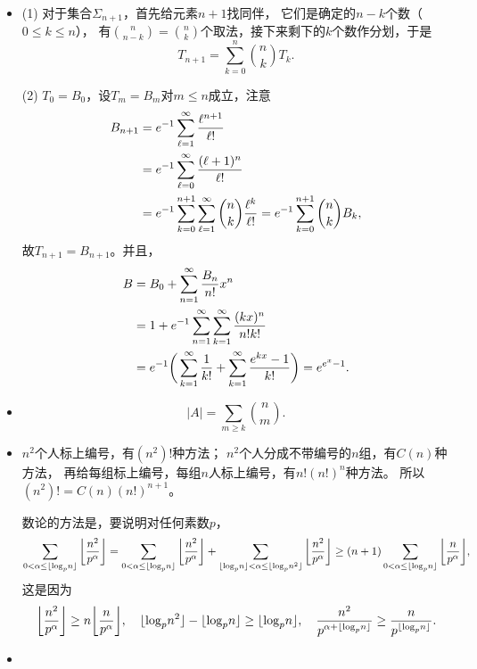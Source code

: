 \begin{itemize}
    (6) $\o\in\ls\{f_n\ge C\}\iff \exists N \st \forall n\ge N, f_n(\o)\ge C
    \implies \forall N, \exists n\ge N \st f_n(\o)\ge C
    \iff \o\in\Big\{\ls f_n\ge C\Big\}$，后面三个一样。

    \item[2.4]
    (1) 对于集合$\Sigma_{n+1}$，首先给元素$n+1$找同伴，
    它们是确定的$n-k$个数（$0\le k\le n$），
    有$\binom{n}{n-k}=\binom{n}{k}$个取法，接下来剩下的$k$个数作分划，于是
    $$T_{n+1}=\sum_{k=0}^n\binom{n}{k}T_k.$$

    (2) $T_0=B_0$，设$T_m=B_m$对$m\le n$成立，注意
    \begin{align*}B_{n+1}&=e^{-1}\sum\limits_{\ell=1}^\infty\frac{\ell^{n+1}}{\ell!}\\
    &=e^{-1}\sum\limits_{\ell=0}^\infty\frac{(\ell+1)^n}{\ell!}\\
    &=e^{-1}\sum_{k=0}^{n+1}\sum\limits_{\ell=1}^\infty\binom{n}{k}\frac{\ell^k}{\ell!}
    =e^{-1}\sum_{k=0}^{n+1}\binom{n}{k}B_k,\end{align*}
    故$T_{n+1}=B_{n+1}$。并且，
    \begin{align*}B&=B_0+\sum\limits_{n=1}^\infty\frac{B_n}{n!}x^n\\
    &=1+e^{-1}\sum\limits_{n=1}^\infty\sum\limits_{k=1}^\infty\frac{(kx)^n}{n!k!}\\
    &=e^{-1}\bigg(\sum\limits_{k=1}^\infty\frac{1}{k!}+\sum\limits_{k=1}^\infty\frac{e^{kx}-1}{k!}\bigg)
    =e^{e^x-1}.\end{align*}

    \item[2.5]
    $$|A|=\sum_{m\ge k}\binom{n}{m}.$$

    \item[2.6]
    $n^2$个人标上编号，有$(n^2)!$种方法；
    $n^2$个人分成不带编号的$n$组，有$C(n)$种方法，
    再给每组标上编号，每组$n$人标上编号，有$n!(n!)^n$种方法。
    所以$(n^2)!=C(n)(n!)^{n+1}$。

    数论的方法是，要说明对任何素数$p$，
    $$\sum_{0<\alpha\le\lfloor\log_p\!n\rfloor}\bigg\lfloor\frac{n^2}{p^\alpha}\bigg\rfloor
    =\sum_{0<\alpha\le\lfloor\log_p\!n\rfloor}\bigg\lfloor\frac{n^2}{p^\alpha}\bigg\rfloor
    +\sum_{\lfloor\log_p\!n\rfloor<\alpha\le\lfloor\log_p\!n^2\rfloor}\bigg\lfloor\frac{n^2}{p^\alpha}\bigg\rfloor
    \ge(n+1)\sum_{0<\alpha\le\lfloor\log_p\!n\rfloor}\bigg\lfloor\frac{n}{p^\alpha}\bigg\rfloor,$$
    这是因为
    $$\bigg\lfloor\frac{n^2}{p^\alpha}\bigg\rfloor
    \ge n\bigg\lfloor\frac{n}{p^\alpha}\bigg\rfloor,\quad
    \lfloor\log_p\!n^2\rfloor-\lfloor\log_p\!n\rfloor\ge\lfloor\log_p\!n\rfloor,\quad
    \frac{n^2}{p^{\alpha+\lfloor\log_p\!n\rfloor}}\ge\frac{n}{p^{\lfloor\log_p\!n\rfloor}}.$$

    \item[2.8]
    

\end{itemize}
